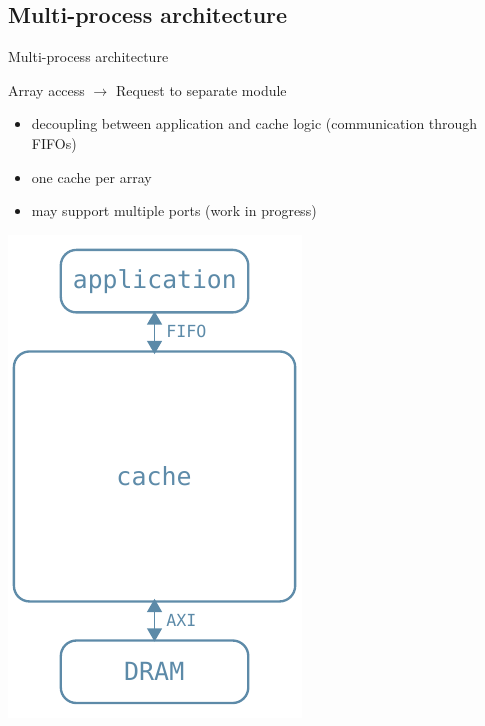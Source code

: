 \documentclass[handout,aspectratio=169]{beamer}
\begin{document}
\subsection{Multi-process architecture}
\begin{frame}{Multi-process architecture}
	\begin{minipage}{.7\textwidth}
		\begin{center}
			Array access $\rightarrow$ Request to separate module
		\end{center}
		\begin{itemize}
			\item decoupling between application and cache logic
				(communication through FIFOs)
			\item one cache per array
			\item may support multiple ports (work in progress)
		\end{itemize}
	\end{minipage}
	\begin{minipage}{.28\textwidth}
		\begin{center}
			\includegraphics[width=.8\textwidth]{complete_arch.pdf}
		\end{center}
	\end{minipage}
\end{frame}
\end{document}
